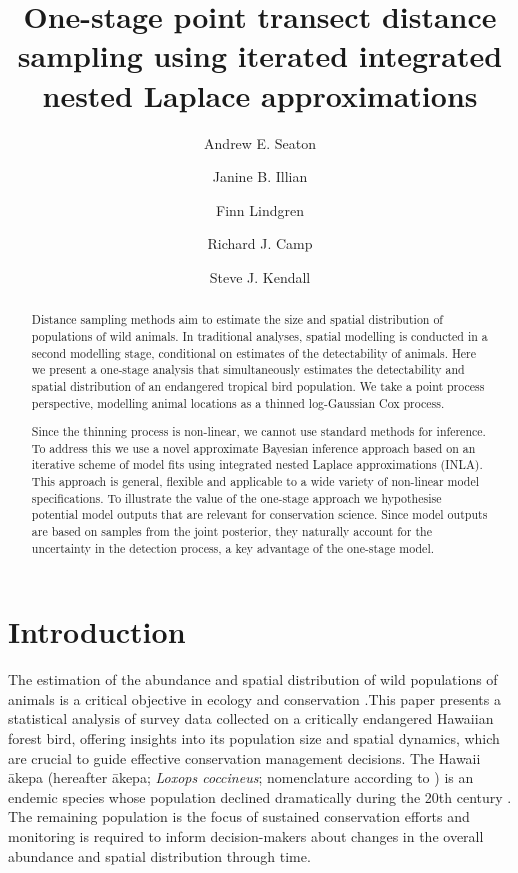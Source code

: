 \documentclass{statsoc}
\title[One-stage point transect distance sampling using iterated INLA]{One-stage point transect distance sampling using iterated integrated nested Laplace approximations}
\author[Andrew E. Seaton {\it et al.}]{Andrew E. Seaton}
\author{Janine B. Illian}
\author{Finn Lindgren}
\author{Richard J. Camp}
\author[Andrew E. Seaton \textit{et al.}]{Steve J. Kendall}
\newcommand{\akepa}{\textquotesingle\={a}kepa}  %
\newcommand{\hawaii}{Hawai\textquotesingle i}   %
\begin{document}
\begin{abstract}
Distance sampling methods aim to estimate the size and spatial distribution of populations of wild animals.  In traditional analyses, spatial modelling is conducted in a second modelling stage, conditional on estimates of the detectability of animals. Here we present a one-stage analysis that simultaneously estimates the detectability and spatial distribution of an endangered tropical bird population.  We take a point process perspective, modelling animal locations as a thinned log-Gaussian Cox process.

Since the thinning process is non-linear, we cannot use standard methods for inference. To address this we use a novel approximate Bayesian inference approach based on an iterative scheme of model fits using integrated nested Laplace approximations (INLA).  This approach is general, flexible and applicable to a wide variety of non-linear model specifications. To illustrate the value of the one-stage approach we hypothesise potential model outputs that are relevant for conservation science.  Since model outputs are based on samples from the joint posterior, they naturally account for the uncertainty in the detection process, a key advantage of the one-stage model. 

\end{abstract}


\section{Introduction}

The estimation of the abundance and spatial distribution of wild populations of animals is a critical objective in ecology and conservation \citep{schwarz_estimating_1999}.This paper presents a statistical analysis of survey data collected on a critically endangered Hawaiian forest bird, offering insights into its population size and spatial dynamics, which are crucial to guide effective conservation management decisions.  The \hawaii{} \akepa{} (hereafter \akepa{}; \textit{Loxops coccineus}; nomenclature according to \citealp{usfws_akepa_1970}) is an endemic species whose population declined dramatically during the 20th century  \citep{usfws_revised_2006, judge_akepa_2018}.  The remaining population is the focus of sustained conservation efforts and monitoring is required to inform decision-makers about changes in the overall abundance and spatial distribution through time.  
\end{document}
